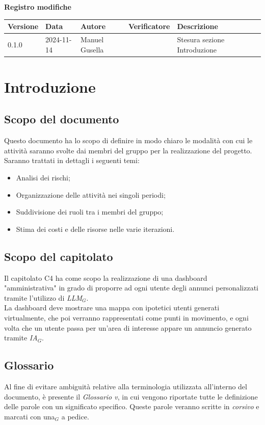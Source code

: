 \documentclass[12pt]{article}
\begin{document}
\setcounter{page}{1}
\begin{center}
\textbf{Registro modifiche}\\
\vspace{2mm}
\begin{tabular}{|l|l|l|l|l|l|}
\hline
\textbf{Versione} & \textbf{Data} & \textbf{Autore} & \textbf{Verificatore} & \textbf{Descrizione}\\
\hline
0.1.0 & 2024-11-14  & Manuel Gusella &   & Stesura sezione Introduzione\\
\hline

\end{tabular}   
\end{center}
\newpage
\tableofcontents
\newpage
\section{Introduzione}
\subsection{Scopo del documento}
Questo documento ha lo scopo di definire in modo chiaro le modalità con cui le attività saranno svolte dai membri del gruppo per la realizzazione del progetto.\\
Saranno trattati in dettagli i seguenti temi:
\begin{itemize}
    \item Analisi dei rischi;
    \item Organizzazione delle attività nei singoli periodi;
    \item Suddivisione dei ruoli tra i membri del gruppo;
    \item Stima dei costi e delle risorse nelle varie iterazioni.
\end{itemize}

\subsection{Scopo del capitolato}
Il capitolato C4 ha come scopo la realizzazione di una dashboard "amministrativa" in grado di proporre ad ogni utente degli annunci personalizzati tramite l'utilizzo di \textit{LLM}$_G$.\\ La dashboard deve mostrare una mappa con ipotetici utenti generati virtualmente, che poi verranno rappresentati come punti in movimento, e ogni volta che un utente passa per un'area di interesse appare un annuncio generato tramite \textit{IA}$_G$.
\subsection{Glossario}
Al fine di evitare ambiguità relative alla terminologia utilizzata all'interno del documento, è presente il \textit{Glossario v}, in cui vengono riportate tutte le definizione delle parole con un significato specifico. Queste parole veranno scritte in \textit{corsivo} e marcati con una$_G$ a pedice. 
\end{document}
